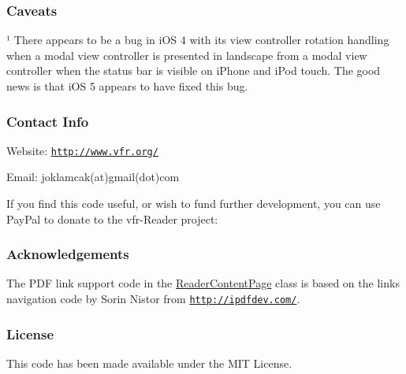 \subsubsection*{Caveats}

¹ There appears to be a bug in i\-O\-S 4 with its view controller rotation handling when a modal view controller is presented in landscape from a modal view controller when the status bar is visible on i\-Phone and i\-Pod touch. The good news is that i\-O\-S 5 appears to have fixed this bug.

\subsubsection*{Contact Info}

Website\-: \href{http://www.vfr.org/}{\tt http\-://www.\-vfr.\-org/}

Email\-: joklamcak(at)gmail(dot)com

If you find this code useful, or wish to fund further development, you can use Pay\-Pal to donate to the vfr-\/\-Reader project\-:

\href{https://www.paypal.com/cgi-bin/webscr?cmd=_donations&business=joklamcak@gmail.com&lc=US&item_name=vfr-Reader&no_note=1&currency_code=USD}{\tt }

\subsubsection*{Acknowledgements}

The P\-D\-F link support code in the \hyperlink{interface_reader_content_page}{Reader\-Content\-Page} class is based on the links navigation code by Sorin Nistor from \href{http://ipdfdev.com/}{\tt http\-://ipdfdev.\-com/}.

\subsubsection*{License}

This code has been made available under the M\-I\-T License. 